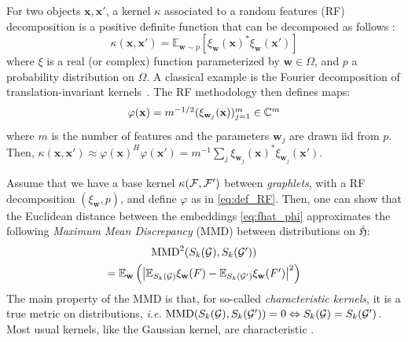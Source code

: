 \documentclass{article}
\begin{document}
For two objects $\mathbf{x}, \mathbf{x'}$, a kernel $\kappa$ associated to a random features (RF) decomposition is a positive definite function that can be decomposed  as follows \cite{rahimi2008random}:
\begin{equation}
\label{eq:RF_decomposition}
\kappa(\mathbf{x},\mathbf{x}')=\mathbb{E}_{\mathbf{w}\sim p}[ \xi_\mathbf{w}(\mathbf{x})^* \xi_\mathbf{w}(\mathbf{x}')]
\end{equation}
where $\xi$ is a real (or complex) function parameterized by $\mathbf{w} \in \Omega$, and $p$ a probability distribution on $\Omega$. A classical example is the Fourier decomposition of translation-invariant kernels~\cite{rahimi2008random}.
The RF methodology then defines maps:
\begin{equation}
	\label{eq:def_RF}
	\mathsmaller{
	\varphi(\mathbf{x}) = m^{-1/2} ( \xi_{\mathbf{w}_j}(\mathbf{x}) )_{j=1}^m \in \mathbb{C}^m}
\end{equation}
where $m$ is the number of features and the parameters $\mathbf{w}_j$ are drawn iid from $p$. Then, $\kappa(\mathbf{x},\mathbf{x}')\approx	\varphi(\mathbf{x})^H	\varphi(\mathbf{x}') = m^{-1} \sum_j \xi_{\mathbf{w}_j}(\mathbf{x})^* \xi_{\mathbf{w}_j}(\mathbf{x}')$. 

Assume that we have a base kernel $\kappa(\mathcal{F},\mathcal{F}')$ between \emph{graphlets}, with a RF decomposition $(\xi_\mathbf{w}, p)$, and define $\varphi$ as in \eqref{eq:def_RF}. Then, one can show \cite{Keriven2017a, Keriven2018} that the Euclidean distance between the embeddings \eqref{eq:fhat_phi} approximates the following \emph{Maximum Mean Discrepancy} (MMD) \cite{Gretton2007, Sriperumbudur2010} between distributions on $\bar{\mathfrak{H}}$:
 \begin{multline}\label{eq:MMD}
 \mathsmaller{
 \textup{MMD}^2(S_k(\G), S_k(\G'))} \\
 \mathsmaller{= \mathbb{E}_{\mathbf{w}} \left( \left| \mathbb{E}_{S_k(\G)} \xi_\mathbf{w}(F) - \mathbb{E}_{S_k(\G')} \xi_\mathbf{w}(F') \right|^2 \right)}
 \end{multline}
The main property of the MMD is that, for so-called \emph{characteristic kernels}, it is a true metric on distributions, \emph{i.e.} $\textup{MMD}(S_k(\mathcal{G}), S_k(\mathcal{G}')) = 0 \Leftrightarrow S_k(\mathcal{G}) = S_k(\mathcal{G}')$. %
Most usual kernels, like the Gaussian kernel, are characteristic \cite{Gretton2007, Sriperumbudur2010}.
%
\end{document}
